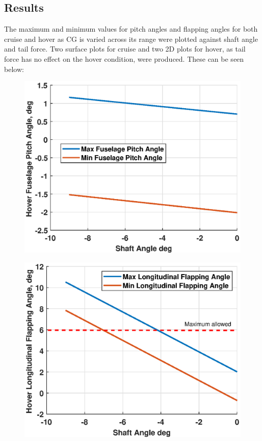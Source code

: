 \documentclass[11pt,a4paper]{article}
\begin{document}
\subsection{Results}

The maximum and minimum values for pitch angles and flapping angles for both cruise and hover as CG is varied across its range were plotted against shaft angle and tail force. Two surface plots for cruise and two 2D plots for hover, as tail force has no effect on the hover condition, were produced. These can be seen below:

\begin{figure}[H]
\centering
\begin{minipage}{.48\textwidth}
  \centering
  \includegraphics[width=\linewidth]{hovershaftpitch.eps}
  \label{fig:hshaftpitch}
\end{minipage}\hspace{0.2cm}
\begin{minipage}{.48\textwidth}
  \centering
  \includegraphics[width=\linewidth]{hovershaftflap.eps}

\end{minipage}
\end{figure}
\end{document}
